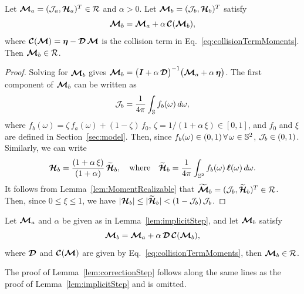 \begin{lemma}
  Let $\boldsymbol{\mathcal{M}}_{a}=(\mathcal{J}_{a},\boldsymbol{\mathcal{H}}_{a})^{T}\in\mathcal{R}$ and $\alpha>0$.  
  Let $\boldsymbol{\mathcal{M}}_{b}=(\mathcal{J}_{b},\boldsymbol{\mathcal{H}}_{b})^{T}$ satisfy
  \begin{equation*}
    \boldsymbol{\mathcal{M}}_{b}=\boldsymbol{\mathcal{M}}_{a}+\alpha\,\boldsymbol{\mathcal{C}}(\boldsymbol{\mathcal{M}}_{b}), 
  \end{equation*}
  where $\boldsymbol{\mathcal{C}}(\boldsymbol{\mathcal{M}})=\boldsymbol{\eta}-\boldsymbol{\mathcal{D}}\,\boldsymbol{\mathcal{M}}$ is the collision term in Eq.~\eqref{eq:collisionTermMoments}.  
  Then $\boldsymbol{\mathcal{M}}_{b}\in\mathcal{R}$.  
  \label{lem:implicitStep}
\end{lemma}
\begin{proof}
  Solving for $\boldsymbol{\mathcal{M}}_{b}$ gives $\boldsymbol{\mathcal{M}}_{b} = \big(\boldsymbol{I}+\alpha\,\boldsymbol{\mathcal{D}}\big)^{-1}\big(\boldsymbol{\mathcal{M}}_{a}+\alpha\,\boldsymbol{\eta}\big)$.  
  The first component of $\boldsymbol{\mathcal{M}}_{b}$ can be written as
  \begin{equation*}
    \mathcal{J}_{b}=\frac{1}{4\pi}\int_{\mathbb{S}}f_{b}(\omega)\,d\omega,
  \end{equation*}
  where $f_{b}(\omega)=\zeta\,f_{a}(\omega)+(1-\zeta)\,f_{0}$, $\zeta=1/(1+\alpha\,\xi)\in[0,1]$, and $f_{0}$ and $\xi$ are defined in Section~\ref{sec:model}.  
  Then, since $f_{b}(\omega)\in(0,1)\,\forall\,\omega\in\mathbb{S}^{2}$, $\mathcal{J}_{b}\in(0,1)$.  
  Similarly, we can write
  \begin{equation*}
    \boldsymbol{\mathcal{H}}_{b}=\frac{(1+\alpha\,\xi)}{(1+\alpha)}\,\widetilde{\boldsymbol{\mathcal{H}}}_{b},
    \quad\text{where}\quad
    \widetilde{\boldsymbol{\mathcal{H}}}_{b}=\frac{1}{4\pi}\int_{\mathbb{S}^{2}}f_{b}(\omega)\,\boldsymbol{\ell}(\omega)\,d\omega.  
  \end{equation*}
  It follows from Lemma~\ref{lem:MomentRealizable} that $\widetilde{\boldsymbol{\boldsymbol{\mathcal{M}}}}_{b}=(\mathcal{J}_{b},\widetilde{\boldsymbol{\mathcal{H}}}_{b})^{T}\in\mathcal{R}$.  
  Then, since $0\le\xi\le1$, we have $|\boldsymbol{\mathcal{H}}_{b}|\le|\widetilde{\boldsymbol{\mathcal{H}}}_{b}| < (1-\mathcal{J}_{b})\,\mathcal{J}_{b}$.  
\end{proof}

\begin{lemma}
  Let $\boldsymbol{\mathcal{M}}_{a}$ and $\alpha$ be given as in Lemma~\ref{lem:implicitStep}, and let $\boldsymbol{\mathcal{M}}_{b}$ satisfy
  \begin{equation*}
    \boldsymbol{\mathcal{M}}_{b}=\boldsymbol{\mathcal{M}}_{a}+\alpha\,\boldsymbol{\mathcal{D}}\,\boldsymbol{\mathcal{C}}(\boldsymbol{\mathcal{M}}_{b}),    
  \end{equation*}
  where $\boldsymbol{\mathcal{D}}$ and $\boldsymbol{\mathcal{C}}(\boldsymbol{\mathcal{M}})$ are given by Eq.~\eqref{eq:collisionTermMoments},  then $\boldsymbol{\mathcal{M}}_{b}\in\mathcal{R}$.  
  \label{lem:correctionStep}
\end{lemma}
The proof of Lemma~\ref{lem:correctionStep} follows along the same lines as the proof of Lemma~\ref{lem:implicitStep} and is omitted.  
